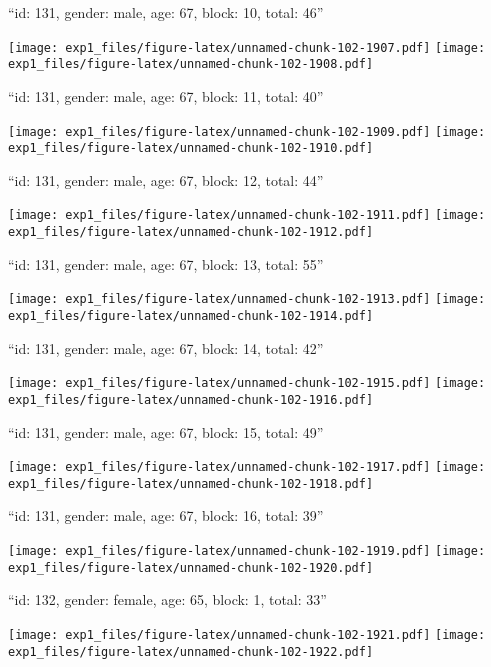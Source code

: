 \documentclass[11pt,,]{article}
\begin{document}
\newpage
[1] 

``id: 131, gender: male, age: 67, block: 10, total: 46''

\texttt{[image: exp1\_files/figure-latex/unnamed-chunk-102-1907.pdf]}
\texttt{[image: exp1\_files/figure-latex/unnamed-chunk-102-1908.pdf]}

\newpage
[1] 

``id: 131, gender: male, age: 67, block: 11, total: 40''

\texttt{[image: exp1\_files/figure-latex/unnamed-chunk-102-1909.pdf]}
\texttt{[image: exp1\_files/figure-latex/unnamed-chunk-102-1910.pdf]}

\newpage
[1] 

``id: 131, gender: male, age: 67, block: 12, total: 44''

\texttt{[image: exp1\_files/figure-latex/unnamed-chunk-102-1911.pdf]}
\texttt{[image: exp1\_files/figure-latex/unnamed-chunk-102-1912.pdf]}

\newpage
[1] 

``id: 131, gender: male, age: 67, block: 13, total: 55''

\texttt{[image: exp1\_files/figure-latex/unnamed-chunk-102-1913.pdf]}
\texttt{[image: exp1\_files/figure-latex/unnamed-chunk-102-1914.pdf]}

\newpage
[1] 

``id: 131, gender: male, age: 67, block: 14, total: 42''

\texttt{[image: exp1\_files/figure-latex/unnamed-chunk-102-1915.pdf]}
\texttt{[image: exp1\_files/figure-latex/unnamed-chunk-102-1916.pdf]}

\newpage
[1] 

``id: 131, gender: male, age: 67, block: 15, total: 49''

\texttt{[image: exp1\_files/figure-latex/unnamed-chunk-102-1917.pdf]}
\texttt{[image: exp1\_files/figure-latex/unnamed-chunk-102-1918.pdf]}

\newpage
[1] 

``id: 131, gender: male, age: 67, block: 16, total: 39''

\texttt{[image: exp1\_files/figure-latex/unnamed-chunk-102-1919.pdf]}
\texttt{[image: exp1\_files/figure-latex/unnamed-chunk-102-1920.pdf]}

\newpage
[1] 

``id: 132, gender: female, age: 65, block: 1, total: 33''

\texttt{[image: exp1\_files/figure-latex/unnamed-chunk-102-1921.pdf]}
\texttt{[image: exp1\_files/figure-latex/unnamed-chunk-102-1922.pdf]}
\end{document}
